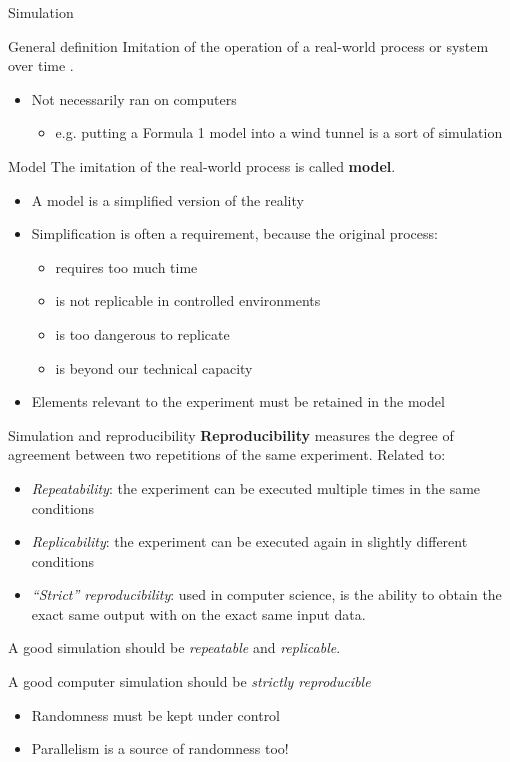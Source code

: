 \documentclass[presentation]{beamer}
\begin{document}
\begin{frame}{Simulation}
	\begin{block}{General definition}
		Imitation of the operation of a real-world process or system over time \cite{des-book}.
		\begin{itemize}
			\item Not necessarily ran on computers
			\begin{itemize}
				\item e.g. putting a Formula 1 model into a wind tunnel is a sort of simulation
			\end{itemize}
		\end{itemize}
	\end{block}
	\begin{block}{Model}
		The imitation of the real-world process is called \textbf{model}.
		\begin{itemize}
			\item A model is a simplified version of the reality
			\item Simplification is often a requirement, because the original process:
			\begin{itemize}
				\item requires too much time
				\item is not replicable in controlled environments
				\item is too dangerous to replicate
				\item is beyond our technical capacity
			\end{itemize}
			\item Elements relevant to the experiment must be retained in the model
		\end{itemize}
	\end{block}
\end{frame}

\begin{frame}{Simulation and reproducibility}
    \textbf{Reproducibility} measures the degree of agreement between two repetitions of the same experiment.
    Related to:
    \begin{itemize}
        \item \textit{Repeatability}: the experiment can be executed multiple times in the same conditions
        \item \textit{Replicability}: the experiment can be executed again in slightly different conditions
        \item \textit{``Strict'' reproducibility}: used in computer science, is the ability to obtain the exact same output with on the exact same input data.
    \end{itemize}

    A good simulation should be \textit{repeatable} and \textit{replicable}.

    A good computer simulation should be \textit{strictly reproducible}
    \begin{itemize}
        \item Randomness must be kept under control
        \item Parallelism is a source of randomness too!
    \end{itemize}
\end{frame}
\end{document}
